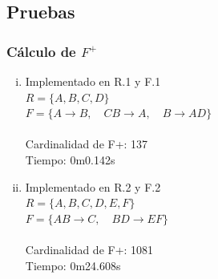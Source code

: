 \documentclass{article}
\begin{document}
\subsection{Pruebas}
\subsubsection{Cálculo de $F^+$} 
\begin{enumerate}[i.]
  \item
    Implementado en R.1 y F.1 \\
    $R = \{A, B ,C, D \}$ \\
    $F = \{ A \rightarrow B, \quad CB \rightarrow A, \quad B \rightarrow AD \}$ \\ \\
    Cardinalidad de F+: 137 \\
    Tiempo: 0m0.142s
  \item
    Implementado en R.2 y F.2 \\
    $R = \{A, B, C, D, E, F\}$ \\
    $F = \{ AB \rightarrow C, \quad BD \rightarrow EF \}$ \\ \\
    Cardinalidad de F+: 1081 \\
    Tiempo: 0m24.608s
\end{enumerate} 
\end{document}
